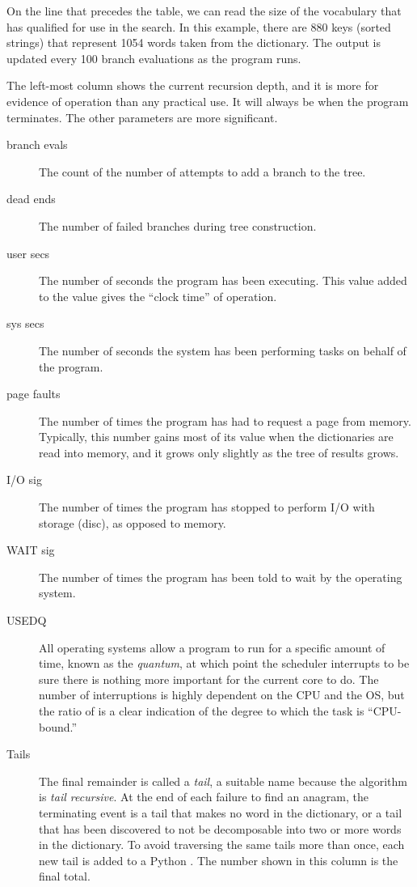 \documentclass[letterpaper, 11pt]{article}
\begin{document}
On the line that precedes the table, we can read the size of the vocabulary
that has qualified for use in the search. In this example, there are 880 keys
(sorted strings) that represent 1054 words taken from the dictionary. 
The output is updated every 100 branch evaluations as the program runs.

The left-most column shows the current recursion depth, and it is more for
evidence of operation than any practical use. It will always be  when
the program terminates. The other parameters are more significant.

\begin{description}
\item[branch evals] The count of the number of attempts to add a branch
to the tree.

\item[dead ends] The number of failed branches during tree construction.

\item[user secs] The number of seconds the program has been executing.
This value added to the  value gives the ``clock time''
of operation.

\item[sys secs] The number of seconds the system has been performing
tasks on behalf of the program.

\item[page faults] The number of times the program has had to request 
a page from memory. Typically, this number gains most of its value when the
dictionaries are read into memory, and it grows only slightly as the
tree of results grows.

\item[I/O sig] The number of times the program has stopped to perform
I/O with storage (disc), as opposed to memory.

\item[WAIT sig] The number of times the program has been told to wait
by the operating system.

\item[USEDQ] All operating systems allow a program to run for a specific
amount of time, known as the \emph{quantum}, at which point the scheduler
interrupts to be sure there is nothing more important for the current 
core to do. The number of interruptions is highly dependent on the 
CPU and the OS, but the ratio of  is a 
clear indication of the degree to which the task is ``CPU-bound.''

\item[Tails] The final remainder is called a \emph{tail}, a suitable
name because the algorithm is \emph{tail recursive}. At the end
of each failure to find an anagram, the terminating event is a 
tail that makes no word in the dictionary, or a tail that has
been discovered to not be decomposable into two or more words
in the dictionary. To avoid traversing the same tails more than
once, each new tail is added to a Python . The number
shown in this column is the final total.

\end{description}
\end{document}
